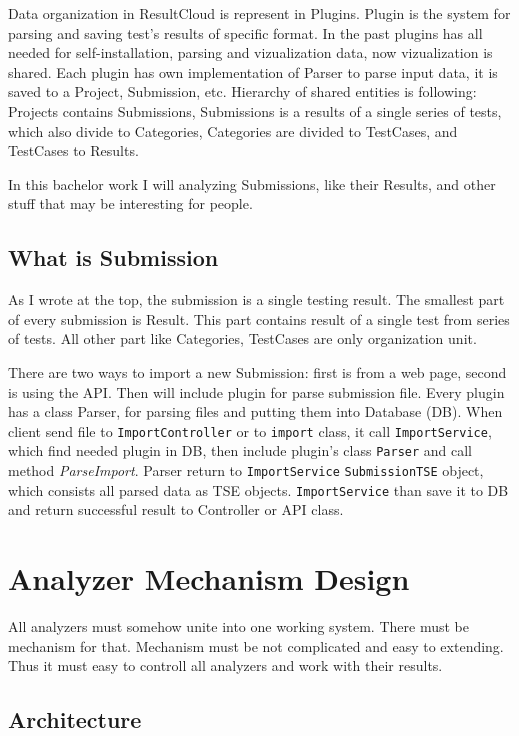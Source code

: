 Data organization in ResultCloud is represent in Plugins. Plugin is the system for parsing and saving test's results of specific format. In the past plugins has all needed for self-installation, parsing and vizualization data, now vizualization is shared. 
Each plugin has own implementation of Parser to parse input data, it is saved to a Project, Submission, etc. Hierarchy of shared entities is following: Projects  contains Submissions, Submissions is a results of a single series of tests, which also divide to Categories, Categories are divided to TestCases, and TestCases to Results.


In this bachelor work I will analyzing Submissions, like their Results, and other stuff that may be interesting for people.

\section{What is Submission}

As I wrote at the top, the submission is a single testing result. The smallest part of every submission is Result. This part contains result of a single test from series of tests. All other part like Categories, TestCases are only organization unit. 

There are two ways to import a new Submission: first is from a web page, second is using the API. Then will include plugin for parse submission file. Every plugin has a class Parser, for parsing files and putting them into Database (DB). When client send file to \texttt{ImportController} or to \texttt{import} class, it call \texttt{ImportService}, which find needed plugin in DB, then include plugin's class \texttt{Parser} and call method \emph{ParseImport}. Parser return to \texttt{ImportService} \texttt{SubmissionTSE} object, which consists all parsed data as TSE objects. \texttt{ImportService} than save it to DB and return successful result to Controller or API class.

\chapter{Analyzer Mechanism Design}

All analyzers must somehow unite into one working system. There must be mechanism for that. Mechanism must be not complicated and easy to extending. Thus it must easy to controll all analyzers and work with their results.

\section{Architecture} 

